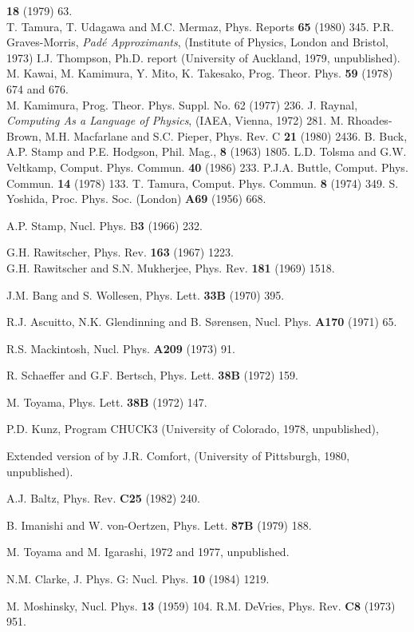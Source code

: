 \documentclass[11pt,a4paper]{article}
\begin{document}
\begin{thebibliography}{99}
{\bf 18} (1979) 63.
\\
T. Tamura, T. Udagawa and M.C. Mermaz,  Phys. Reports {\bf 65} (1980) 345.
P.R. Graves-Morris, {\em Pad\'e Approximants},
(Institute of Physics, London and Bristol, 1973)
I.J. Thompson, Ph.D. report (University of Auckland, 1979, unpublished).
M. Kawai, M. Kamimura, Y. Mito, K. Takesako, Prog. Theor. Phys.
{\bf 59} (1978) 674 and 676.
\\
M. Kamimura, Prog. Theor. Phys. Suppl. No. 62 (1977) 236.
J. Raynal, {\em Computing As a Language of Physics},
(IAEA, Vienna, 1972) 281.
M. Rhoades-Brown, M.H. Macfarlane and S.C. Pieper,
Phys. Rev. C {\bf 21} (1980) 2436.
B. Buck, A.P. Stamp and P.E. Hodgson, Phil. Mag., {\bf 8} (1963)
1805.
L.D. Tolsma and G.W. Veltkamp, Comput. Phys. Commun. {\bf 40} (1986)
233.
P.J.A. Buttle, Comput. Phys. Commun. {\bf 14} (1978) 133.
T. Tamura,  Comput. Phys. Commun. {\bf 8} (1974) 349.
S. Yoshida, Proc. Phys. Soc. (London) {\bf A69} (1956) 668.

A.P. Stamp, Nucl. Phys. B{\bf 3} (1966) 232.

G.H. Rawitscher, Phys. Rev. {\bf 163} (1967) 1223.
\\
G.H. Rawitscher and S.N. Mukherjee, Phys. Rev. {\bf 181} (1969) 1518.

J.M. Bang and S. Wollesen, Phys. Lett. {\bf 33B} (1970) 395.

R.J. Ascuitto, N.K. Glendinning and B. S{\o}rensen,
Nucl. Phys. {\bf A170} (1971) 65.

R.S. Mackintosh, Nucl. Phys. {\bf A209} (1973) 91.

R. Schaeffer and G.F. Bertsch, Phys. Lett. {\bf 38B} (1972) 159.

M. Toyama, Phys. Lett. {\bf 38B} (1972) 147.

P.D. Kunz, Program CHUCK3 (University of Colorado, 1978, unpublished),

Extended version of \cite{CHUCK}
by J.R. Comfort, (University of Pittsburgh, 1980, unpublished).

A.J. Baltz, Phys. Rev. {\bf C25} (1982) 240.

B. Imanishi and W. von-Oertzen, Phys. Lett. {\bf 87B} (1979) 188.

M. Toyama and M. Igarashi, 1972 and 1977, unpublished.

N.M. Clarke, J. Phys. G: Nucl. Phys. {\bf 10} (1984) 1219.

M. Moshinsky, Nucl. Phys. {\bf 13} (1959) 104.
R.M. DeVries, Phys. Rev. {\bf C8} (1973) 951.
\end{thebibliography}
\appendix
\newpage
\end{document}
